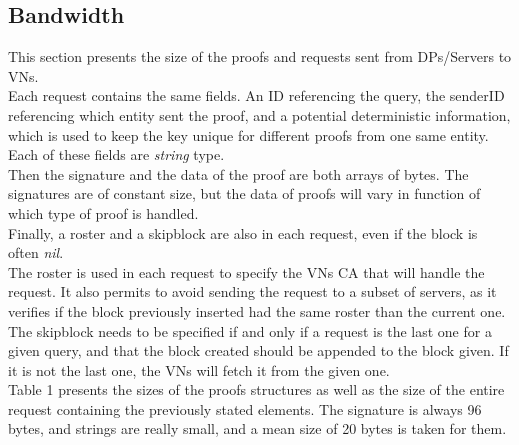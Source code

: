 \documentclass{article}
\begin{document}
\subsection{Bandwidth}
This section presents the size of the proofs and requests sent from DPs/Servers to VNs.\\


Each request contains the same fields. An ID referencing the query, the senderID referencing which entity sent the proof, and a potential deterministic information, which is used to keep the key unique for different proofs from one same entity. Each of these fields are \textit{string} type.\\
Then the signature and the data of the proof are both arrays of bytes. The signatures are of constant size, but the data of proofs will vary in function of which type of proof is handled.\\
Finally, a roster and a skipblock are also in each request, even if the block is often \textit{nil}.\\
The roster is used in each request to specify the VNs CA that will handle the request. It also permits to avoid sending the request to a subset of servers, as it verifies if the block previously inserted had the same roster than the current one.\\
The skipblock needs to be specified if and only if a request is the last one for a given query, and that the block created should be appended to the block given. If it is not the last one, the VNs will fetch it from the given one.\\


Table 1 presents the sizes of the proofs structures as well as the size of the entire request containing the previously stated elements. The signature is always 96 bytes, and strings are really small, and a mean size of 20 bytes is taken for them.\\
\end{document}
